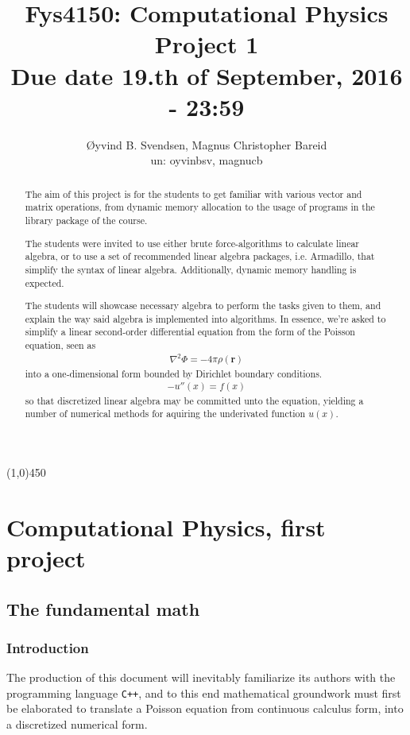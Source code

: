 \documentclass[11pt,a4paper,notitlepage]{article}
\title{\normalsize Fys4150: Computational Physics \\
\vspace{10mm}
\huge Project 1\\
\vspace{10mm}
\normalsize Due date {\bf 19.th of September, 2016 - 23:59}}
\author{Øyvind B. Svendsen, Magnus Christopher Bareid \\ un: oyvinbsv, magnucb}
\begin{document}
\noindent
\maketitle
\vspace{10mm}
\begin{abstract}
The aim of this project is for the students to get familiar with various vector and matrix operations, from dynamic memory allocation to the usage of programs in the library package of the course.

The students were invited to use either brute force-algorithms to calculate linear algebra, or to use a set of recommended linear algebra packages, i.e. Armadillo, that simplify the syntax of linear algebra. Additionally, dynamic memory handling is expected.

The students will showcase necessary algebra to perform the tasks given to them, and explain the way said algebra is implemented into algorithms. In essence, we're asked to simplify a linear second-order differential equation from the form of the Poisson equation, seen as
\begin{align*}
\nabla ^2 \Phi = -4\pi\rho(\mathbf{r})
\end{align*}
into a one-dimensional form bounded by Dirichlet boundary conditions.
\begin{align*}
-u''(x) = f(x)
\end{align*}
so that discretized linear algebra may be committed unto the equation, yielding a number of numerical methods for aquiring the underivated function $u(x)$.
\end{abstract}
\begin{center}
\line(1,0){450}
\end{center}

\tableofcontents

\newpage
\section{Computational Physics, first project}
\subsection{The fundamental math}
\subsubsection{Introduction}
The production of this document will inevitably familiarize its authors with the programming language \verb|C++|, and to this end mathematical groundwork must first be elaborated to translate a Poisson equation from continuous calculus form, into a discretized numerical form.
\end{document}
